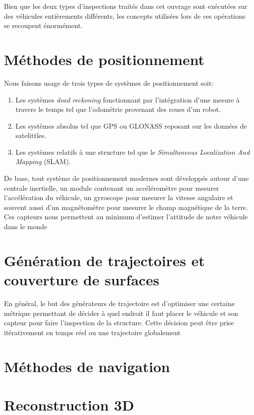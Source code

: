 \label{sec:RevLitt}

Bien que les deux types d'inspections traités dans cet ouvrage sont exécutées sur des véhicules entièrements différents, les concepts utilisées lors de ces opérations se recoupent énormément.

\section{Méthodes de positionnement}

Nous faisons usage de trois types de systèmes de positionnement soit:
\begin{enumerate}
  \item Les systèmes \textit{dead reckoning} fonctionnant par l'intégration d'une mesure à travers le temps tel que l'odométrie provenant des roues d'un robot.
  \item Les systèmes absolus tel que GPS ou GLONASS reposant sur les données de satelittles.
  \item Les systèmes relatifs à une structure tel que le \textit{Simultaneous Localization And Mapping} (SLAM).
\end{enumerate}

De base, tout système de positionnement modernes sont développés autour d'une centrale inertielle, un module contenant un accéléromètre pour mesurer l'accélération du véhicule, un gyroscope pour mesurer la vitesse angulaire et souvent aussi d'un magnétomètre pour mesurer le champ magnétique de la terre. Ces capteurs nous permettent au minimum d'estimer l'attitude de notre véhicule dans le monde

\section{Génération de trajectoires et couverture de surfaces}

En général, le but des générateurs de trajectoire est d'optimiser une certaine métrique permettant de décider à quel endroit il faut placer le véhicule et son capteur pour faire l'inspection de la structure. Cette décision peut être prise itérativement en temps réel ou une trajectoire globalement

\section{Méthodes de navigation}

\section{Reconstruction 3D}
